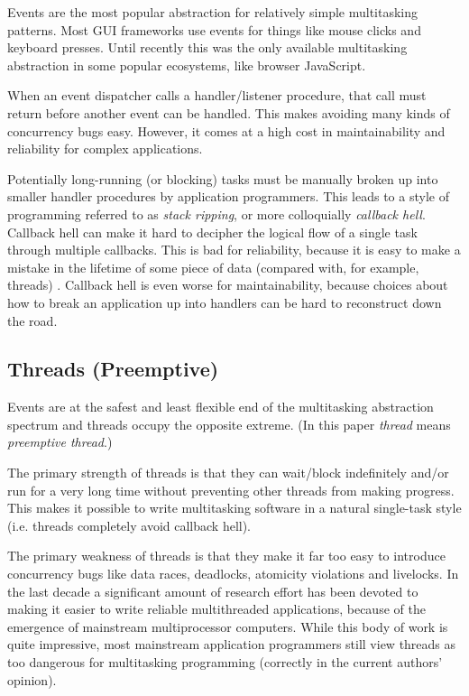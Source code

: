 \documentclass[10pt,preprint]{sigplanconf}
\begin{document}
Events are the most popular abstraction for relatively simple multitasking patterns.
Most GUI frameworks use events for things like mouse clicks and keyboard presses.
Until recently this was the only available multitasking abstraction in some popular ecosystems, like browser JavaScript.

When an event dispatcher calls a handler/listener procedure, that call must return before another event can be handled.
This makes avoiding many kinds of concurrency bugs easy.
However, it comes at a high cost in maintainability and reliability for complex applications.

Potentially long-running (or blocking) tasks must be manually broken up into smaller handler procedures by application programmers.
This leads to a style of programming referred to as \emph{stack ripping}\cite{Adya2002}, or more colloquially \emph{callback hell}.
Callback hell can make it hard to decipher the logical flow of a single task through multiple callbacks.
This is bad for reliability, because it is easy to make a mistake in the lifetime of some piece of data (compared with, for example, threads) \cite{Behren2003a}.
Callback hell is even worse for maintainability, because choices about how to break an application up into handlers can be hard to reconstruct down the road.

\subsection{Threads (Preemptive)}

Events are at the safest and least flexible end of the multitasking abstraction spectrum and threads occupy the opposite extreme.
(In this paper \emph{thread} means \emph{preemptive thread}.)

The primary strength of threads is that they can wait/block indefinitely and/or run for a very long time without preventing other threads from making progress.
This makes it possible to write multitasking software in a natural single-task style (i.e. threads completely avoid callback hell).

The primary weakness of threads is that they make it far too easy to introduce concurrency bugs like data races, deadlocks, atomicity violations and livelocks.
In the last decade a significant amount of research effort has been devoted to making it easier to write reliable multithreaded applications, because of the emergence of mainstream multiprocessor computers.
While this body of work is quite impressive, most mainstream application programmers still view threads as too dangerous for multitasking programming (correctly in the current authors' opinion).
\end{document}
